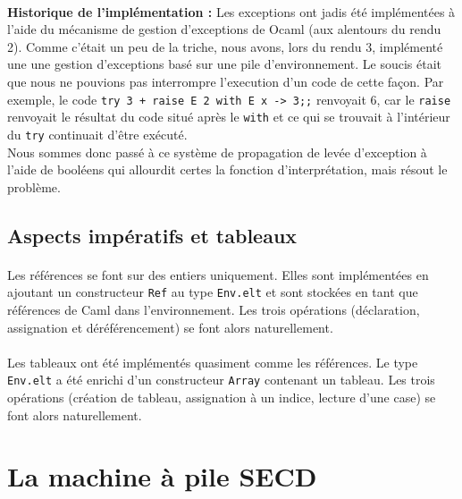 \paragraph{}\textbf{Historique de l'implémentation :} Les exceptions ont jadis été implémentées à l'aide du mécanisme de gestion d'exceptions de Ocaml (aux alentours du rendu 2). Comme c'était un peu de la triche, nous avons, lors du rendu 3, implémenté une une gestion d'exceptions basé sur une pile d'environnement. Le soucis était que nous ne pouvions pas interrompre l'execution d'un code de cette façon. Par exemple, le code \texttt{try 3 + raise E 2 with E x -> 3;;} renvoyait 6, car le \texttt{raise} renvoyait le résultat du code situé après le \texttt{with} et ce qui se trouvait à l'intérieur du \texttt{try} continuait d'être exécuté. \\
Nous sommes donc passé à ce système de propagation de levée d'exception à l'aide de booléens qui allourdit certes la fonction d'interprétation, mais résout le problème.

\subsection{Aspects impératifs et tableaux}

\paragraph{} Les références se font sur des entiers uniquement. Elles sont implémentées en ajoutant un constructeur \texttt{Ref} au type \texttt{Env.elt} et sont stockées en tant que références de Caml dans l'environnement. Les trois opérations (déclaration, assignation et déréférencement) se font alors naturellement.

\paragraph{} Les tableaux ont été implémentés quasiment comme les références. Le type \texttt{Env.elt} a été enrichi d'un constructeur \texttt{Array} contenant un tableau. Les trois opérations (création de tableau, assignation à un indice, lecture d'une case) se font alors naturellement.




\section{La machine à pile SECD} %

